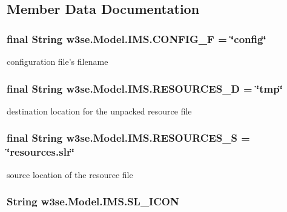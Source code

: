 \subsection{Member Data Documentation}
\hypertarget{classw3se_1_1_model_1_1_i_m_s_a2efd11a7e744fc72a8c66c78f3626b91}{
\subsubsection[{C\-O\-N\-F\-I\-G\-\_\-\-F}]{\setlength{\rightskip}{0pt plus 5cm}final String w3se.\-Model.\-I\-M\-S.\-C\-O\-N\-F\-I\-G\-\_\-\-F = \char`\"{}config\char`\"{}}}\label{classw3se_1_1_model_1_1_i_m_s_a2efd11a7e744fc72a8c66c78f3626b91}
configuration file's filename \hypertarget{classw3se_1_1_model_1_1_i_m_s_a68c70498a2d0137a0f9793f4e414a729}{
\subsubsection[{R\-E\-S\-O\-U\-R\-C\-E\-S\-\_\-\-D}]{\setlength{\rightskip}{0pt plus 5cm}final String w3se.\-Model.\-I\-M\-S.\-R\-E\-S\-O\-U\-R\-C\-E\-S\-\_\-\-D = \char`\"{}tmp\char`\"{}}}\label{classw3se_1_1_model_1_1_i_m_s_a68c70498a2d0137a0f9793f4e414a729}
destination location for the unpacked resource file \hypertarget{classw3se_1_1_model_1_1_i_m_s_a9d24fecc0bafc942c529dd1700cba7d2}{
\subsubsection[{R\-E\-S\-O\-U\-R\-C\-E\-S\-\_\-\-S}]{\setlength{\rightskip}{0pt plus 5cm}final String w3se.\-Model.\-I\-M\-S.\-R\-E\-S\-O\-U\-R\-C\-E\-S\-\_\-\-S = \char`\"{}resources.\-slr\char`\"{}}}\label{classw3se_1_1_model_1_1_i_m_s_a9d24fecc0bafc942c529dd1700cba7d2}
source location of the resource file \hypertarget{classw3se_1_1_model_1_1_i_m_s_a53f9517bd3166639b2b605e730f07632}{
\subsubsection[{S\-L\-\_\-\-I\-C\-O\-N}]{\setlength{\rightskip}{0pt plus 5cm}String w3se.\-Model.\-I\-M\-S.\-S\-L\-\_\-\-I\-C\-O\-N}}\label{classw3se_1_1_model_1_1_i_m_s_a53f9517bd3166639b2b605e730f07632}
